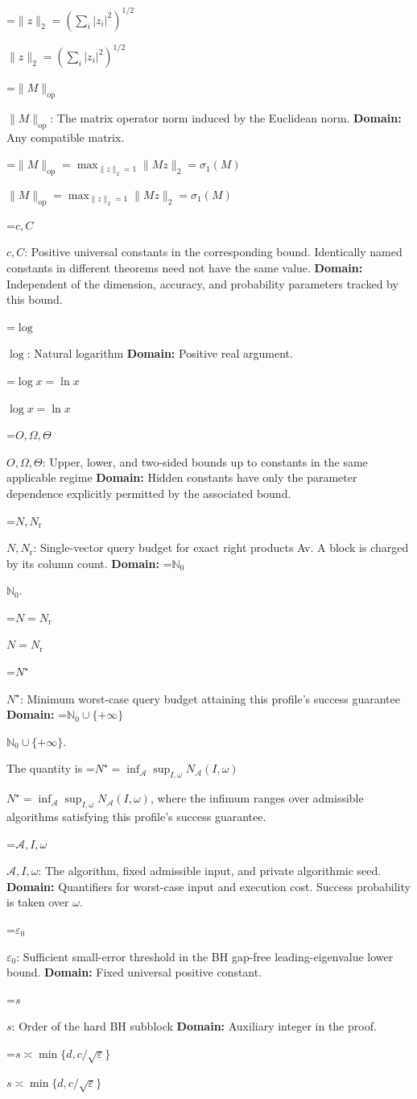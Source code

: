 \documentclass[10pt,a4paper]{article}
\newcommand{\AtlasMath}[1]{\par\begingroup\centering\setbox0=\hbox{$\displaystyle #1$}\ifdim\wd0>1.4\linewidth\typeout{ATLAS WIDE FORMULA: \the\wd0}\fi\ifdim\wd0>\linewidth\resizebox{\linewidth}{!}{\box0}\else\box0\fi\par\endgroup}
\newcommand{\AtlasInlineMath}[1]{\begingroup\setbox0=\hbox{$#1$}\ifdim\wd0>.4\linewidth\endgroup\AtlasMath{#1}\else\endgroup$#1$\fi}
\begin{document}
\AtlasInlineMath{\|z\|_2=(\sum_i|z_i|^2)^{1/2}}

\AtlasInlineMath{\|M\|_{\mathrm{op}}}: The matrix operator norm induced by the Euclidean norm. \textbf{Domain:} Any compatible matrix.

\AtlasInlineMath{\|M\|_{\mathrm{op}}=\max_{\|z\|_2=1}\|Mz\|_2=\sigma_1(M)}

\AtlasInlineMath{c,C}: Positive universal constants in the corresponding bound. Identically named constants in different theorems need not have the same value. \textbf{Domain:} Independent of the dimension, accuracy, and probability parameters tracked by this bound.

\AtlasInlineMath{\log}: Natural logarithm \textbf{Domain:} Positive real argument.

\AtlasInlineMath{\log x=\ln x}

\AtlasInlineMath{O,\Omega,\Theta}: Upper, lower, and two-sided bounds up to constants in the same applicable regime \textbf{Domain:} Hidden constants have only the parameter dependence explicitly permitted by the associated bound.

\AtlasInlineMath{N,N_{\mathrm r}}: Single-vector query budget for exact right products Av. A block is charged by its column count. \textbf{Domain:} \AtlasInlineMath{\mathbb N_0}.

\AtlasInlineMath{N=N_{\mathrm r}}

\AtlasInlineMath{N^\star}: Minimum worst-case query budget attaining this profile's success guarantee \textbf{Domain:} \AtlasInlineMath{\mathbb N_0\cup\{+\infty\}}.

The quantity is \AtlasInlineMath{N^\star=\inf_{\mathcal A}\sup_{I,\omega}N_{\mathcal A}(I,\omega)}, where the infimum ranges over admissible algorithms satisfying this profile's success guarantee.

\AtlasInlineMath{\mathcal A,I,\omega}: The algorithm, fixed admissible input, and private algorithmic seed. \textbf{Domain:} Quantifiers for worst-case input and execution cost. Success probability is taken over $\omega$.

\AtlasInlineMath{\varepsilon_0}: Sufficient small-error threshold in the BH gap-free leading-eigenvalue lower bound. \textbf{Domain:} Fixed universal positive constant.

\AtlasInlineMath{s}: Order of the hard BH subblock \textbf{Domain:} Auxiliary integer in the proof.

\AtlasInlineMath{s\asymp\min\{d,c/\sqrt\varepsilon\}}
\end{document}
